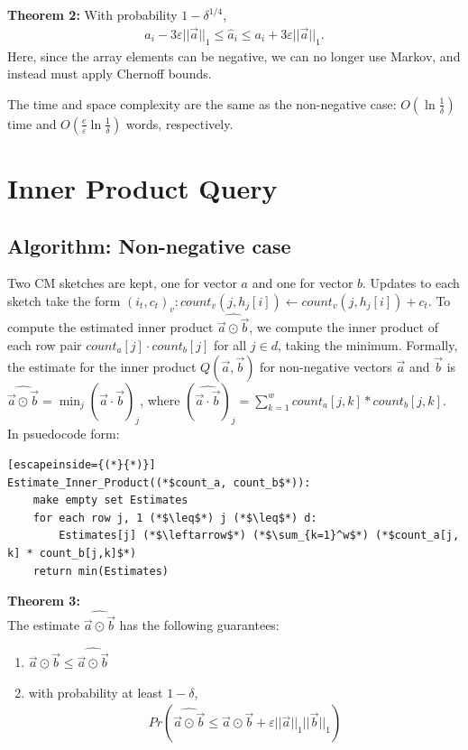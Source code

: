 \documentclass[11pt]{article}
\begin{document}
\textbf{Theorem 2:} With probability $1 - \delta^{1/4}$,
\begin{align}
    a_i - 3\varepsilon||\vec{a}||_1 \leq \hat{a}_i \leq a_i + 3\varepsilon||\vec{a}||_1. 
\end{align}
Here, since the array elements can be negative, we can no longer use Markov, and instead must apply Chernoff
bounds. 

The time and space complexity are the same as the non-negative case: $O(\ln
\frac{1}{\delta})$ time and $O(\frac{e}{\varepsilon}\ln \frac{1}{\delta})$
words, respectively. {

\section{Inner Product Query}
	\subsection{Algorithm: Non-negative case}
        Two CM sketches are kept, one for vector $a$ and one for vector $b$.
        Updates to each sketch take the form $(i_t,c_t)_v: count_v(j, h_j[i]) \leftarrow
        count_v(j, h_j[i]) + c_t$. To compute the estimated inner product
        $\widehat{\vec{a} \odot \vec{b}}$, we compute the inner product of each
        row pair $count_a[j] \cdot count_b[j]$ for all $j \in d$, taking the
        minimum. Formally, the estimate for the inner product
        $\mathit{Q}(\vec{a},\vec{b})$ for non-negative vectors $\vec{a}$ and
        $\vec{b}$ is $\widehat{\vec{a} \odot \vec{b}} = \min_j(\widehat{\vec a
        \cdot \vec b})_j$, where $(\widehat{\vec a \cdot \vec b})_j =
        \sum_{k=1}^w count_a[j,k] * count_b[j,k]$. In psuedocode form:\\
        
\begin{lstlisting}[escapeinside={(*}{*)}]
Estimate_Inner_Product((*$count_a, count_b$*)): 
    make empty set Estimates 
    for each row j, 1 (*$\leq$*) j (*$\leq$*) d:
        Estimates[j] (*$\leftarrow$*) (*$\sum_{k=1}^w$*) (*$count_a[j, k] * count_b[j,k]$*)
    return min(Estimates) 
\end{lstlisting}
\textbf{Theorem 3:}\\
        The estimate $\widehat{\vec{a} \odot \vec{b}}$ has the following guarantees:
        \begin{enumerate}[label=\textnormal{(\arabic*)}]
            \item $\vec a \odot \vec b \leq \widehat{\vec a \odot \vec b}$
            \item with probability at least $1 - \delta$, 
            \begin{align}
		        Pr(\widehat{\vec a \odot \vec b} \leq \vec a \odot \vec b + \varepsilon||\vec a||_1||\vec b||_1)
            \end{align}
        \end{enumerate}
}
\end{document}
